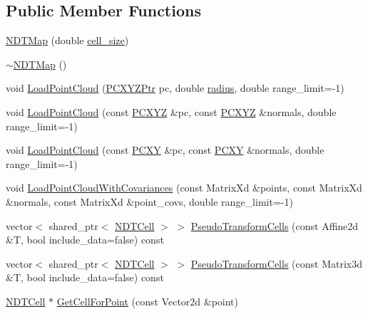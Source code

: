 \subsection*{Public Member Functions}
\begin{DoxyCompactItemize}
\item 
\hyperlink{classNDTMap_aec578016c17abfe085d0d4cf1dca1828}{N\+D\+T\+Map} (double \hyperlink{classNDTMap_a3395ccebb28846b416550ba71b5da174}{cell\+\_\+size})
\item 
\hyperlink{classNDTMap_af6e42f0f13a33e6027e14635631e1312}{$\sim$\+N\+D\+T\+Map} ()
\item 
void \hyperlink{classNDTMap_a7a6596502043035b352cb470f869f79c}{Load\+Point\+Cloud} (\hyperlink{ndt__map_8h_a467e4d48ef8154e4fd6d76d355cae2da}{P\+C\+X\+Y\+Z\+Ptr} pc, double \hyperlink{test__match_8cc_a3f67c53b80389c5f53961936edba04c9}{radius}, double range\+\_\+limit=-\/1)
\item 
void \hyperlink{classNDTMap_a1a724122f19f58baa09c0e24b67ca697}{Load\+Point\+Cloud} (const \hyperlink{ndt__map_8h_a20282c1dd3c86f9bc25e124768cdbe3d}{P\+C\+X\+YZ} \&pc, const \hyperlink{ndt__map_8h_a20282c1dd3c86f9bc25e124768cdbe3d}{P\+C\+X\+YZ} \&normals, double range\+\_\+limit=-\/1)
\item 
void \hyperlink{classNDTMap_abb9af807d3928dc11bf734c961fc5662}{Load\+Point\+Cloud} (const \hyperlink{ndt__map_8h_ae39e6a39986574e0b1dd694a8a8c2a39}{P\+C\+XY} \&pc, const \hyperlink{ndt__map_8h_ae39e6a39986574e0b1dd694a8a8c2a39}{P\+C\+XY} \&normals, double range\+\_\+limit=-\/1)
\item 
void \hyperlink{classNDTMap_a9d74f6496cf555cbe0c41139a59a0e44}{Load\+Point\+Cloud\+With\+Covariances} (const Matrix\+Xd \&points, const Matrix\+Xd \&normals, const Matrix\+Xd \&point\+\_\+covs, double range\+\_\+limit=-\/1)
\item 
vector$<$ shared\+\_\+ptr$<$ \hyperlink{classNDTCell}{N\+D\+T\+Cell} $>$ $>$ \hyperlink{classNDTMap_a9203c659af7f7da483d4533885a332f8}{Pseudo\+Transform\+Cells} (const Affine2d \&T, bool include\+\_\+data=false) const
\item 
vector$<$ shared\+\_\+ptr$<$ \hyperlink{classNDTCell}{N\+D\+T\+Cell} $>$ $>$ \hyperlink{classNDTMap_aae233bcc01ec9e8af59fb45bd235736b}{Pseudo\+Transform\+Cells} (const Matrix3d \&T, bool include\+\_\+data=false) const
\item 
\hyperlink{classNDTCell}{N\+D\+T\+Cell} $\ast$ \hyperlink{classNDTMap_a4d4dad624af3df75327d0e279be3d477}{Get\+Cell\+For\+Point} (const Vector2d \&point)
\item 

\end{DoxyCompactItemize}
